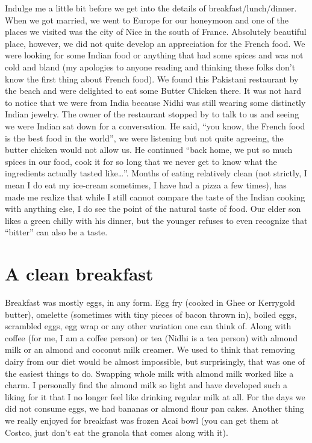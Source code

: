 \documentclass[
  oneside]{book}
\begin{document}
Indulge me a little bit before we get into the details of breakfast/lunch/dinner. When we got married, we went to Europe for our honeymoon and one of the places we visited was the city of Nice in the south of France. Absolutely beautiful place, however, we did not quite develop an appreciation for the French food. We were looking for some Indian food or anything that had some spices and was not cold and bland (my apologies to anyone reading and thinking these folks don't know the first thing about French food). We found this Pakistani restaurant by the beach and were delighted to eat some Butter Chicken there. It was not hard to notice that we were from India because Nidhi was still wearing some distinctly Indian jewelry. The owner of the restaurant stopped by to talk to us and seeing we were Indian sat down for a conversation. He said, ``you know, the French food is the best food in the world'', we were listening but not quite agreeing, the butter chicken would not allow us. He continued ``back home, we put so much spices in our food, cook it for so long that we never get to know what the ingredients actually tasted like\ldots{}''. Months of eating relatively clean (not strictly, I mean I do eat my ice-cream sometimes, I have had a pizza a few times), has made me realize that while I still cannot compare the taste of the Indian cooking with anything else, I do see the point of the natural taste of food. Our elder son likes a green chilly with his dinner, but the younger refuses to even recognize that ``bitter'' can also be a taste.

\hypertarget{a-clean-breakfast}{%
\section{A clean breakfast}\label{a-clean-breakfast}}

Breakfast was mostly eggs, in any form. Egg fry (cooked in Ghee or Kerrygold butter), omelette (sometimes with tiny pieces of bacon thrown in), boiled eggs, scrambled eggs, egg wrap or any other variation one can think of. Along with coffee (for me, I am a coffee person) or tea (Nidhi is a tea person) with almond milk or an almond and coconut milk creamer. We used to think that removing dairy from our diet would be almost impossible, but surprisingly, that was one of the easiest things to do. Swapping whole milk with almond milk worked like a charm. I personally find the almond milk so light and have developed such a liking for it that I no longer feel like drinking regular milk at all. For the days we did not consume eggs, we had bananas or almond flour pan cakes. Another thing we really enjoyed for breakfast was frozen Acai bowl (you can get them at Costco, just don't eat the granola that comes along with it).
\end{document}
